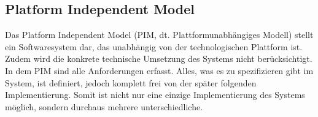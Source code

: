\subsection{Platform Independent Model} \label{PIM}
Das Platform Independent Model (PIM, dt. Plattformunabhängiges Modell) stellt ein
Softwaresystem dar, das unabhängig von der technologischen Plattform ist. Zudem wird die konkrete technische Umsetzung des Systems nicht berücksichtigt. In dem PIM
sind alle Anforderungen erfasst. Alles, was es zu spezifizieren gibt im System, ist definiert,
jedoch komplett frei von der später folgenden Implementierung. Somit ist nicht nur eine
einzige Implementierung des Systems möglich, sondern durchaus mehrere
unterschiedliche.